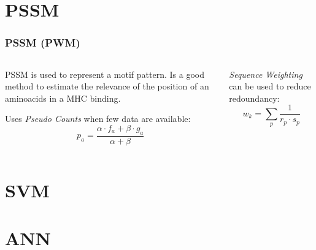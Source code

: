 \documentclass[presentation]{beamer}   %
\begin{document}
\section{PSSM}
\begin{frame}
 \frametitle{PSSM (PWM)}
 \begin{columns}
  \begin{column}{5cm}
   \begin{block}\centering
    PSSM is used to represent a motif pattern.
    Is a good method to estimate the relevance 
    of the position of an aminoacids in a MHC binding. 
   \end{block}
   \pause
   \begin{block}\centering
   Uses \textit{Pseudo Counts} when few data are available:
    \begin{equation}
     p_a = \frac{\alpha \cdot f_a + \beta \cdot g_a}{\alpha + \beta}
    \end{equation}
   \end{block}
   \pause
  \end{column}
  \begin{column}{5cm}
   \begin{block}\centering
    \textit{Sequence Weighting} can be used to reduce redoundancy:
    \begin{equation}
     w_{k} = \sum_{p}{\frac{1}{r_p \cdot s_p}}
    \end{equation}

   \end{block}
   \pause
   \begin{block}\centering
   
   \end{block}
  
  
  \end{column}
 \end{columns}

\end{frame}

\section{SVM}
\begin{frame}

\end{frame}

\section{ANN}
\begin{frame}

\end{frame}
\end{document}
